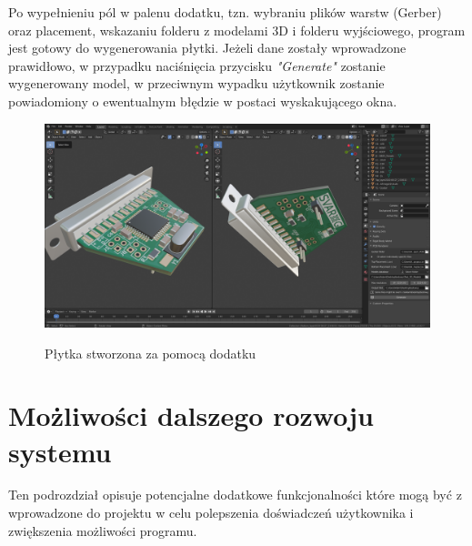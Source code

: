 \documentclass{xmgr}
\begin{document}
\newpage





Po wypełnieniu pól w palenu dodatku, tzn. wybraniu plików warstw (Gerber) oraz placement, wskazaniu folderu z modelami 3D i folderu wyjściowego, program jest gotowy do wygenerowania płytki. Jeżeli dane zostały wprowadzone prawidłowo, w przypadku naciśnięcia przycisku \emph{"Generate"} zostanie wygenerowany model, w przeciwnym wypadku użytkownik zostanie powiadomiony o ewentualnym błędzie w postaci wyskakującego okna. 

\begin{figure}
\centering
\includegraphics[width=1\hsize]{fig/addon_generated}
\caption{Płytka stworzona za pomocą dodatku}
 \label{img3}
\end{figure}

\section{Możliwości dalszego rozwoju systemu}
Ten podrozdział opisuje potencjalne dodatkowe funkcjonalności które mogą być z wprowadzone do projektu w celu polepszenia doświadczeń użytkownika i zwiększenia możliwości programu.
\end{document}

